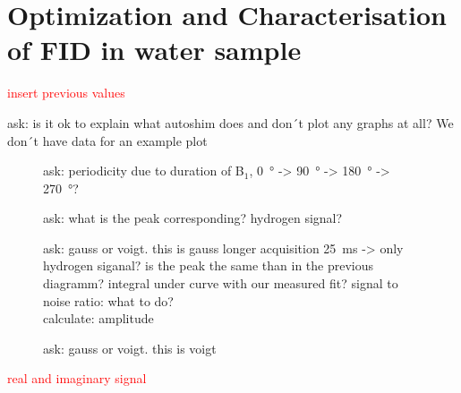 \section{Optimization and Characterisation of FID in water sample}
\label{sec:OptimizationandCharacterisationofFIDinwatersample}

\textcolor{red}{insert previous values}

ask: is it ok to explain what autoshim does and don´t plot any graphs at all? We don´t have data for an example plot

\begin{figure}[H]
    \centering
    
    \caption[]{ask: periodicity due to duration of B$_1$, \SI{0}{\degree} -> \SI{90}{\degree} -> \SI{180}{\degree} -> \SI{270}{\degree}?}
    \label{fig:B1dauer}
\end{figure}

\begin{figure}[H]
    \centering
    
    \caption[]{}
    \label{fig:pulsedurationbeispiel}
\end{figure}

\begin{figure}[H]
    \centering
    
    \caption[]{ask: what is the peak corresponding? hydrogen signal?}
    \label{fig:Pulsandcollect}
\end{figure}



\begin{figure}[H]
    \centering
    
    \caption[]{ask: gauss or voigt. this is gauss\newline
    longer acquisition \SI{25}{\milli \second} -> only hydrogen siganal? is the peak the same than in the previous diagramm? \newline
    integral under curve with our measured fit?\newline
    signal to noise ratio: what to do?
    \\
    calculate: amplitude}
    \label{fig:Pulsandcollect138_delay_25_gauss}
\end{figure}
\begin{figure}[H]
    \centering
    
    \caption[]{ask: gauss or voigt. this is voigt}
    \label{fig:PulsandcollePulsandcollect138_delay_25_voigtctlangerdelay}
\end{figure}

\textcolor{red}{real and imaginary signal}